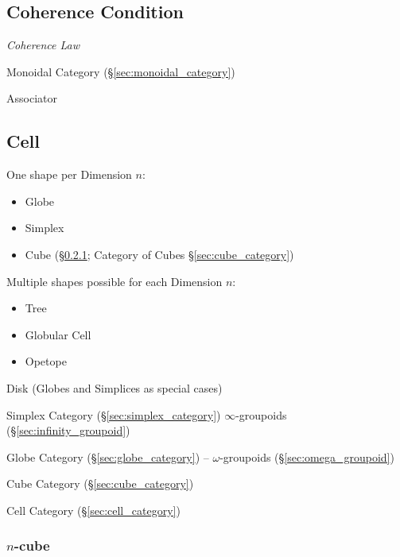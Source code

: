 \subsection{Coherence Condition}\label{sec:coherence_condition}

\emph{Coherence Law}

Monoidal Category (\S\ref{sec:monoidal_category})

Associator



\subsection{Cell}\label{sec:cell}

One shape per Dimension $n$:
\begin{itemize}
  \item Globe
  \item Simplex
  \item Cube (\S\ref{sec:cellular_n_cube}; \fist Category of Cubes
    \S\ref{sec:cube_category})
\end{itemize}

Multiple shapes possible for each Dimension $n$:
\begin{itemize}
  \item Tree
  \item Globular Cell
  \item Opetope
\end{itemize}

Disk (Globes and Simplices as special cases)

\fist Simplex Category (\S\ref{sec:simplex_category})
$\infty$-groupoids (\S\ref{sec:infinity_groupoid})

\fist Globe Category (\S\ref{sec:globe_category}) --
$\omega$-groupoids (\S\ref{sec:omega_groupoid})

\fist Cube Category (\S\ref{sec:cube_category})

\fist Cell Category (\S\ref{sec:cell_category})



\subsubsection{$n$-cube}\label{sec:cellular_n_cube}

